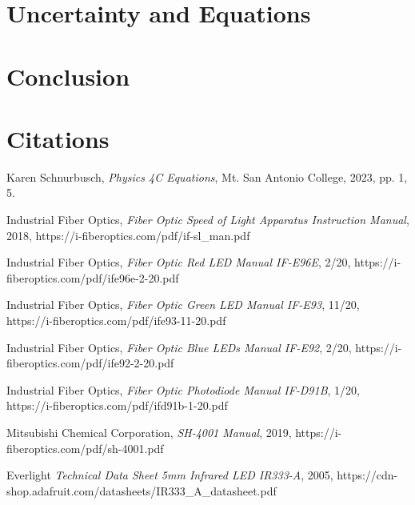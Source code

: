 \documentclass[12pt]{iopart} %
\begin{document}
\section{Uncertainty and Equations}

\section{Conclusion}

\section{Citations}

\begin{thebibliography}{9}

  Karen Schnurbusch,
  \textit{Physics 4C Equations},
  Mt. San Antonio College,
  2023,
  pp. 1, 5.

  Industrial Fiber Optics,
  \textit{Fiber Optic Speed of Light Apparatus Instruction Manual},
  2018,
  https://i-fiberoptics.com/pdf/if-sl\_man.pdf

  Industrial Fiber Optics,
  \textit{Fiber Optic Red LED Manual IF-E96E},
  2/20,
  https://i-fiberoptics.com/pdf/ife96e-2-20.pdf

  Industrial Fiber Optics,
  \textit{Fiber Optic Green LED Manual IF-E93},
  11/20,
  https://i-fiberoptics.com/pdf/ife93-11-20.pdf

  Industrial Fiber Optics,
  \textit{Fiber Optic Blue LEDs Manual IF-E92},
  2/20,
  https://i-fiberoptics.com/pdf/ife92-2-20.pdf

  Industrial Fiber Optics,
  \textit{Fiber Optic Photodiode Manual IF-D91B},
  1/20,
  https://i-fiberoptics.com/pdf/ifd91b-1-20.pdf

  Mitsubishi Chemical Corporation,
  \textit{SH-4001 Manual},
  2019,
  https://i-fiberoptics.com/pdf/sh-4001.pdf

  Everlight
  \textit{Technical Data Sheet 5mm Infrared LED IR333-A},
  2005,
  https://cdn-shop.adafruit.com/datasheets/IR333\_A\_datasheet.pdf

\end{thebibliography}
\end{document}
